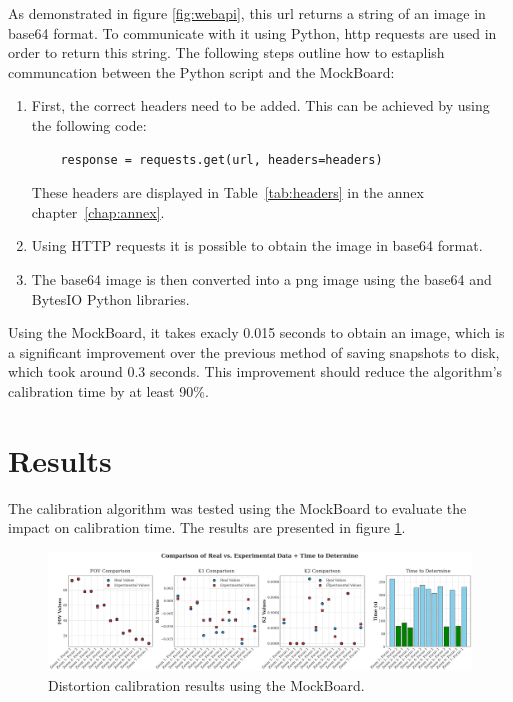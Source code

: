\noindent As demonstrated in figure \ref{fig:webapi}, this url returns a string of an image in base64 format.
To communicate with it using Python, http requests are used in order to return this string. The following steps outline how to estaplish communcation between the 
Python script and the MockBoard:


\begin{enumerate}
    \item First, the correct headers need to be added. This can be achieved by using the following code:
    
    \begin{verbatim}
    response = requests.get(url, headers=headers)
    \end{verbatim}
    
    These headers are displayed in Table~\ref{tab:headers} in the annex chapter~\ref{chap:annex}.

    \item Using HTTP requests it is possible to obtain the image in base64 format.
    \item The base64 image is then converted into a png image using the base64 and BytesIO Python libraries.
\end{enumerate}


Using the MockBoard, it takes exacly 0.015 seconds to obtain an image, which is a significant improvement over the previous method of saving snapshots to disk, which took around 0.3 seconds. This 
improvement should reduce the algorithm's calibration time by at least 90\%.

\section{Results} \label{sec:Results}

\noindent The calibration algorithm was tested using the MockBoard to evaluate the impact on calibration time. The results are presented in figure \ref{fig:results}.

\begin{figure}[ht]
    \centering
    \includegraphics[width=\textwidth]{Images/05optimize/r_graph.png}
    \caption{Distortion calibration results using the MockBoard.}
    \label{fig:results}
\end{figure}

